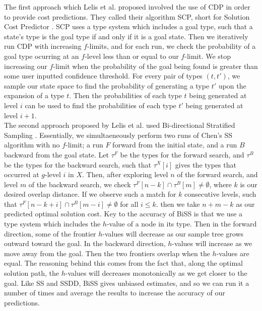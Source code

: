 \documentclass{article}
\begin{document}
The first approach which Lelis et al. proposed involved the use of CDP
in order to provide cost predictions.
They called their algorithm SCP, short for Solution Cost Predictor \cite{lelis2011predicting}.
SCP uses a type system which includes a goal type,
such that a state's type is the goal type if and only if it is a goal state.
Then we iteratively run CDP with increasing \(f\)-limits,
and for each run, we check the probability of a goal type ocurring
at an \(f\)-level less than or equal to our \(f\)-limit.
We stop increasing our \(f\)-limit when the probability of the goal
being found is greater than some user inputted confidence threshold.
For every pair of types \((t, t')\), we sample our state space to find the probability of generating a type \(t'\)
upon the expansion of a type \(t\). Then the probabilities of each type \(t\)
being generated at level \(i\) can be used to find the probabilities of each type \(t'\)
being generated at level \(i + 1\). \\

The second approach proposed by Lelis et al. used Bi-directional Stratified Sampling \cite{lelis2012predicting}.
Essentially, we simultaeneously perform two runs of Chen's SS algorithm with no \(f\)-limit;
a run \(F\) forward from the initial state, and a run \(B\) backward from the goal state.
Let \(\tau^F\) be the types for the forward search, and \(\tau^B\) be the types for the backward search,
such that \(\tau^X[i]\) gives the types that occurred at \(g\)-level \(i\) in \(X\).
Then, after exploring level \(n\) of the forward search, and level \(m\) of the backward search,
we check \(\tau^F[n - k] \cap \tau^B[m] \not = \emptyset\), where \(k\) is our desired overlap distance.
If we observe such a match for \(k\) consecutive levels,
such that \(\tau^F[n - k + i] \cap \tau^B[m - i] \not = \emptyset\) for all \(i \leq k\).
then we take \(n + m - k\) as our predicted optimal solution cost.
Key to the accuracy of BiSS is that we use a type system which includes the \(h\)-value of
a node in its type. Then in the forward direction, some of the frontier \(h\)-values will decrease
as our sample tree grows outward toward the goal.
In the backward direction, \(h\)-values will increase as we
move away from the goal.
Then the two frontiers overlap when the \(h\)-values are equal.
The reasoning behind this comes from the fact that, along the
optimal solution path, the \(h\)-values will decreases monotonically
as we get closer to the goal.
Like SS and SSDD, BiSS gives unbiased estimates, and so we can
run it a number of times and average the results to increase the accuracy of our predictions. \\
\end{document}
